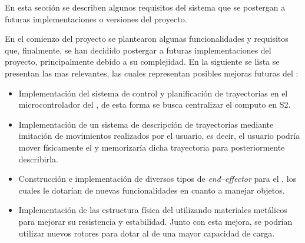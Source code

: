 En esta sección se describen algunos requisitos del sistema que se postergan a futuras implementaciones o versiones del proyecto.

En el comienzo del proyecto se plantearon algunas funcionalidades y requisitos que, finalmente, se han decidido postergar a futuras implementaciones del proyecto, principalmente debido a su complejidad. En la siguiente se lista se presentan las mas relevantes, las cuales representan posibles mejoras futuras del \pArm{}:
\begin{itemize}
    \item Implementación del sistema de control y planificación de trayectorias en el microcontrolador del \pArm{}, de esta forma se busca centralizar el computo en \ac{S2}.
    \item Implementación de un sistema de descripción de trayectorias mediante imitación de movimientos realizados por el usuario, es decir, el usuario podría mover físicamente el \pArm{} y memorizaría dicha trayectoria para posteriormente describirla.
    \item Construcción e implementación de diversos tipos de \textit{end--effector} para el \pArm{}, los cuales le dotarían de nuevas funcionalidades en cuanto a manejar objetos.
    \item Implementación de las estructura física del \pArm{} utilizando materiales metálicos para mejorar su resistencia y estabilidad. Junto con esta mejora, se podrían utilizar nuevos rotores para dotar al \pArm{} de una mayor capacidad de carga.
\end{itemize}

  